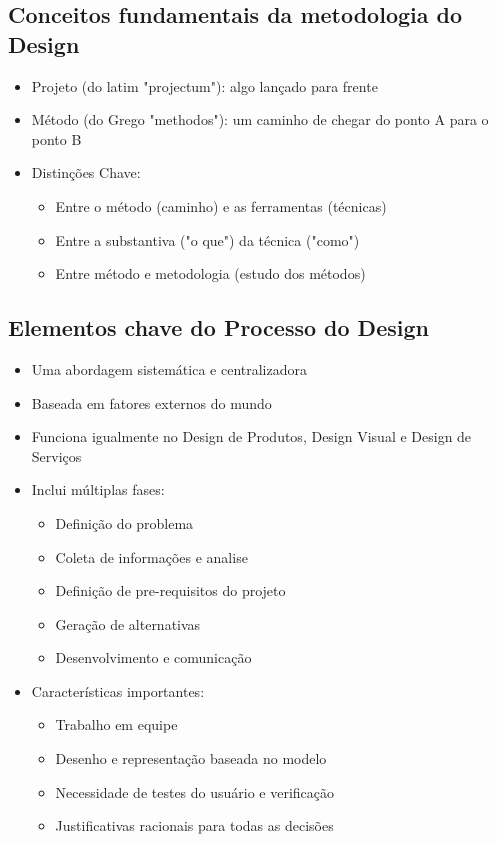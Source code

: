 \documentclass{article}
\begin{document}
\subsection{Conceitos fundamentais da metodologia do Design}
\begin{itemize}
    \item Projeto (do latim "projectum"): algo lançado para frente
    \item Método (do Grego "methodos"): um caminho de chegar do ponto A para o ponto B
    \item Distinções Chave:
    \begin{itemize}
        \item Entre o método (caminho) e as ferramentas (técnicas)
        \item Entre a substantiva ("o que") da técnica ("como")
        \item Entre método e metodologia (estudo dos métodos)
    \end{itemize}
\end{itemize}
\subsection{Elementos chave do Processo do Design}
\begin{itemize}
    \item Uma abordagem sistemática e centralizadora
    \item Baseada em fatores externos do mundo
    \item Funciona igualmente no Design de Produtos, Design Visual e Design de Serviços
    \item Inclui múltiplas fases:
    \begin{itemize}
        \item Definição do problema
        \item Coleta de informações e analise
        \item Definição de pre-requisitos do projeto
        \item Geração de alternativas
        \item Desenvolvimento e comunicação
    \end{itemize}
    \item Características importantes:
    \begin{itemize}
        \item Trabalho em equipe
        \item Desenho e representação baseada no modelo
        \item Necessidade de testes do usuário e verificação
        \item Justificativas racionais para todas as decisões
    \end{itemize}
\end{itemize}
\end{document}
